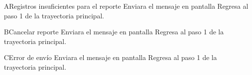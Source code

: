 		\begin{UCtrayectoriaA}{A}{Registros insuficientes para el reporte}
			\UCpaso[\UCsist] Enviara el  mensaje en pantalla 
			\UCpaso[\UCsist] Regresa al paso 1 de la trayectoria principal.
		\end{UCtrayectoriaA}
		
		
		\begin{UCtrayectoriaA}{B}{Cancelar reporte}
			\UCpaso[\UCsist] Enviara el mensaje en pantalla 
			\UCpaso[\UCsist] Regresa al paso 1 de la trayectoria principal.
		\end{UCtrayectoriaA}	
		
		\begin{UCtrayectoriaA}{C}{Error de envío}
			\UCpaso[\UCsist] Enviara el mensaje en pantalla 
			\UCpaso[\UCsist] Regresa al paso 1 de la trayectoria principal.
		\end{UCtrayectoriaA}			
		
		
		
		
